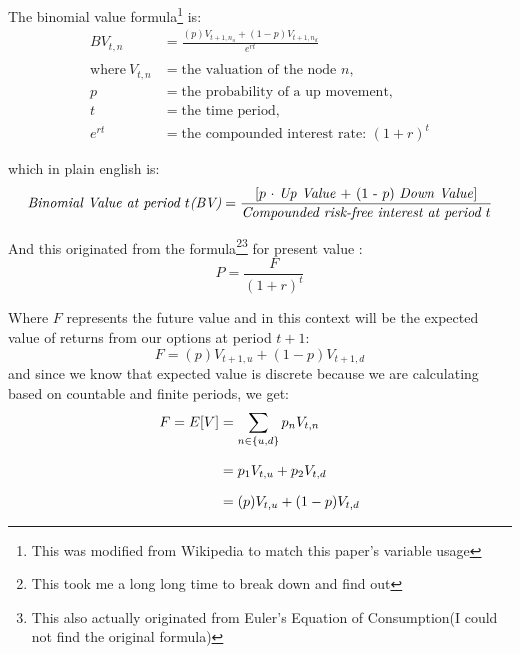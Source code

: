 \documentclass[12pt, letterpaper]{article}\usepackage{float}
\begin{document}
\bigskip

The binomial value formula\footnote{This was modified from Wikipedia to match this paper's variable usage} is:
\begin{align*}
  BV_{t, n} &= \frac{(p)V_{t+1,n_u} + (1-p)V_{t+1,n_d}}{e^{rt}} \\
  \\
  \text{where}~V_{t,n} &= \text{the valuation of the node ${n}$}, \\
  p &= \text{the probability of a up movement}, \\
  t &= \text{the time period}, \\
  e^{rt} &= \text{the compounded interest rate: } (1 + r)^t
\end{align*}

\pagebreak

\noindent which in plain english is:
\begin{equation*}
  \text{\textit{Binomial Value at period ${t}$(BV)}} = \frac{\text{[${p}$ ${\cdot}$ \textit{Up Value} + (1 - ${p}$) \textit{Down Value}]}}{\text{\textit{Compounded risk-free interest at period ${t}$}}}
\end{equation*}

\bigskip

And this originated from the formula\footnote{This took me a long long time to break down and find out}\footnote{This also actually originated from Euler's Equation of Consumption\cite{riskneutralmeasurestackexchange}(I could not find the original formula) } for present value \cite{presentvaluewikipedia}:
\begin{equation*}
  P = \frac{F}{(1+r)^t}
\end{equation*}

\noindent Where ${F}$ represents the future value and in this context will be the expected value of returns from our options at period ${t+1}$:
\begin{equation*}
  F = (p)V_{t+1,u} + (1-p)V_{t+1,d}
\end{equation*}
and since we know that expected value is discrete because we are calculating based on countable and finite periods, we get\cite{hussainteaching}:
\begin{equation*}
  \setlength{\jot}{10pt}
  \begin{split}
    F = E[V] 
    & = \sum\limits_{n \in \{u,d\}} p_n V_{t,n} \\
    & = p_1 V_{t,u} + p_2 V_{t,d} \\
    & = (p) V_{t,u} + (1-p) V_{t,d} \\
  \end{split}
\end{equation*}
\end{document}
